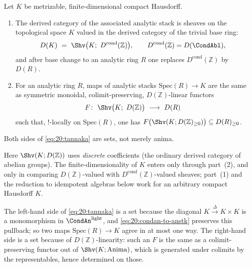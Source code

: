 \begin{theorem}
\label{thm:20:compact-hausdorff}
Let $K$ be metrizable, finite-dimensional compact Hausdorff.
\begin{enumerate}
\item The derived category of the associated analytic stack is sheaves on the
topological space $K$ valued in the derived category of the trivial base ring:
\begin{equation*}
D(K)\ =\ \Shv\bigl(K;\ D^{\mathrm{cond}}(\mathbb Z)\bigr),
\qquad D^{\mathrm{cond}}(\mathbb Z)=D(\CondAbl),
\end{equation*}
and after base change to an analytic ring $R$ one replaces $D^{\mathrm{cond}}
(\mathbb Z)$ by $D(R)$.
\item For an analytic ring $R$, maps of analytic stacks $\mathrm{Spec}(R)\to K$
are the same as symmetric monoidal, colimit-preserving, $D(\mathbb Z)$-linear
functors
\begin{equation}
\label{eq:20:tannaka}
F\colon\ \Shv\bigl(K;\ D(\mathbb Z)\bigr)\ \longrightarrow\ D(R)
\end{equation}
such that, $!$-locally on $\mathrm{Spec}(R)$, one has
$F\bigl(\Shv(K;D(\mathbb Z)_{\ge0})\bigr)\subseteq D(R)_{\ge0}$.
\end{enumerate}
Both sides of \eqref{eq:20:tannaka} are sets, not merely anima.
\end{theorem}

Here $\Shv(K;D(\mathbb Z))$ uses \emph{discrete} coefficients (the ordinary
derived category of abelian groups). The finite-dimensionality of $K$ enters
only through part~(2), and only in comparing $D(\mathbb Z)$-valued with
$D^{\mathrm{cond}}(\mathbb Z)$-valued sheaves; part~(1) and the reduction to
idempotent algebras below work for an arbitrary compact Hausdorff $K$.

\begin{remark}
\label{rmk:20:both-sets}
The left-hand side of \eqref{eq:20:tannaka} is a set because the diagonal
$K\xrightarrow{\Delta}K\times K$ is a monomorphism in $\CondAn^{\mathrm{light}}$,
and \eqref{eq:20:condan-to-anstk} preserves this pullback; so two maps
$\mathrm{Spec}(R)\to K$ agree in at most one way. The right-hand side is a set
because of $D(\mathbb Z)$-linearity: such an $F$ is the same as a
colimit-preserving functor out of $\Shv(K;\mathrm{Anima})$, which is generated
under colimits by the representables, hence determined on those.
\end{remark}

